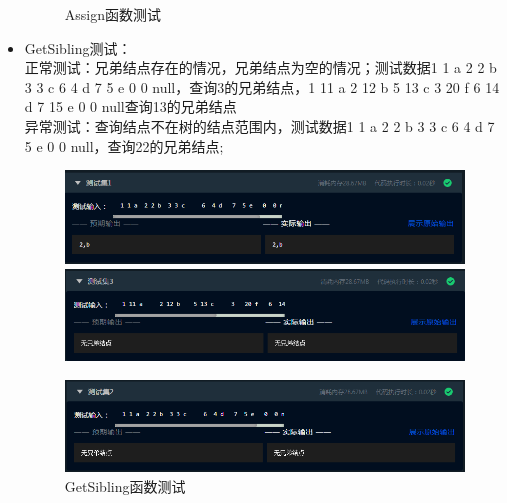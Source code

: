 \documentclass[supercite]{Experimental_Report}
\theoremstyle{definition}
\begin{document}
\begin{itemize}
\begin{figure}[htbp]
\begin{minipage}{0.9\linewidth}
		      \end{minipage}
		      \caption{Assign函数测试}
		      \label{fig2-9}
	      \end{figure}
	\item GetSibling测试：\\正常测试：兄弟结点存在的情况，兄弟结点为空的情况；测试数据1 1 a 2 2 b 3 3 c 6 4 d 7 5 e 0 0 null，查询3的兄弟结点，1 11 a 2 12 b 5 13 c 3 20 f 6 14 d 7 15 e 0  0 null查询13的兄弟结点\\
	      异常测试：查询结点不在树的结点范围内，测试数据1 1 a 2 2 b 3 3 c 6 4 d 7 5 e 0 0 null，查询22的兄弟结点;
	      \begin{figure}[htbp]
		      \centering
		      \begin{minipage}{0.9\linewidth}
			      \centering
			      \includegraphics[width=0.9\linewidth]{images/test-70.png}
		      \end{minipage}
		      \begin{minipage}{0.9\linewidth}
			      \centering
			      \includegraphics[width=0.9\linewidth]{images/test-71.png}
		      \end{minipage}
	      \end{figure}
	      \newpage
	      \begin{figure}[htbp]
		      \centering
		      \begin{minipage}{0.9\linewidth}
			      \centering
			      \includegraphics[width=0.9\linewidth]{images/test-72.png}
		      \end{minipage}
		      \caption{GetSibling函数测试}
		      \label{fig2-10}
	      \end{figure}

\end{itemize}
\end{document}
